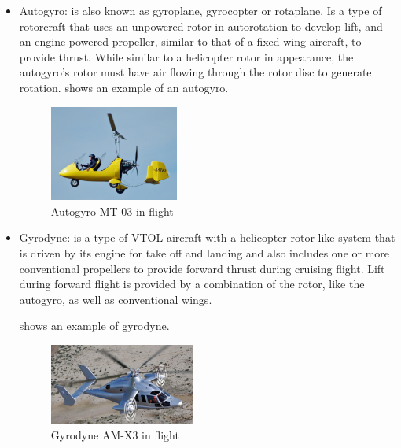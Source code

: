 \begin{itemize}
%
\item Autogyro: is also known as gyroplane, gyrocopter or rotaplane. Is a type of rotorcraft that uses an unpowered rotor in autorotation to develop lift, and an engine-powered propeller, similar to that of a fixed-wing aircraft, to provide thrust. While similar to a helicopter rotor in appearance, the autogyro's rotor must have air flowing through the rotor disc to generate rotation.  shows an example of an autogyro.

      \begin{figure}[h!]
        \centering
        \includegraphics[width=0.4\textwidth]{figures/autogyro.jpg}
        \caption{Autogyro MT-03 in flight}\label{auto}
      \end{figure}

  \item Gyrodyne: is a type of VTOL aircraft with a helicopter rotor-like system that is driven by its engine for take off and landing and also includes one or more conventional propellers to provide forward thrust during cruising flight. Lift during forward flight is provided by a combination of the rotor, like the autogyro, as well as conventional wings.

    shows an example of gyrodyne.
      \begin{figure}[h!]
        \centering
        \includegraphics[width=0.45\textwidth]{figures/gyro.jpg}
        \caption{Gyrodyne AM-X3 in flight}\label{gyro}
      \end{figure}

\end{itemize}

